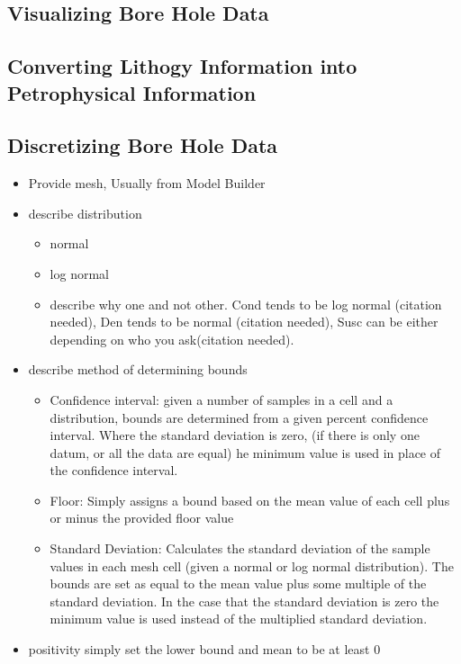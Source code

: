 \subsection{Visualizing Bore Hole Data}
\label{subsec:visBH}

\subsection{Converting Lithogy Information into Petrophysical Information}
\label{subsec:lithBH}

\subsection{Discretizing Bore Hole Data}
\label{subsec:discBH}

\begin{itemize}
 \item Provide mesh, Usually from Model Builder
 \item describe distribution 
 \begin{itemize}
  \item normal
  \item log normal
  \item describe why one and not other. Cond tends to be log normal (citation needed), Den tends to be normal (citation needed), Susc can be either depending on who you ask(citation needed).
 \end{itemize}
 \item describe method of determining bounds
 \begin{itemize}
  \item Confidence interval: given a number of samples in a cell and a distribution, bounds are determined from a given percent confidence interval. Where the standard deviation is zero, (if there is only one datum, or all the data are equal) he minimum value is used in place of the confidence interval.
  \item Floor: Simply assigns a bound based on the mean value of each cell plus or minus the provided floor value
  \item Standard Deviation: Calculates the standard deviation of the sample values in each mesh cell (given a normal or log normal distribution). The bounds are set as equal to the mean value plus some multiple of the standard deviation. In the case that the standard deviation is zero the minimum value is used instead of the multiplied standard deviation. 
 \end{itemize}
 \item positivity simply set the lower bound and mean to be at least 0
\end{itemize}

